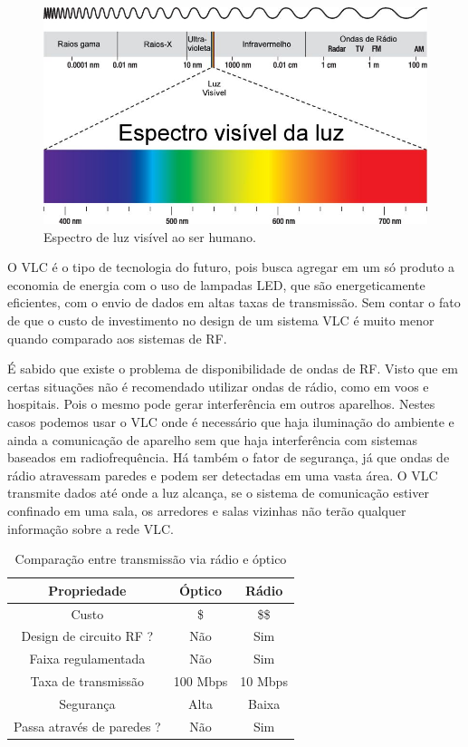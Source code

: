 \begin{figure}
	\centering
		\includegraphics[width = 12cm]{figuras/espectro-visivel-da-luz}
	\caption{Espectro de luz visível ao ser humano.}
	\label{Fig: espectro-visivel-da-luz}
\end{figure}


O VLC é o tipo de tecnologia do futuro, pois busca agregar em um só produto a economia de energia com o uso de lampadas LED, que são energeticamente eficientes, com o envio de dados em altas taxas de transmissão. Sem contar o fato de que o custo de investimento no design de um sistema VLC é muito menor quando comparado aos sistemas de RF.

É sabido que existe o problema de disponibilidade de ondas de RF. Visto que em certas situações não é recomendado utilizar ondas de rádio, como em voos e hospitais. Pois o mesmo pode gerar interferência em outros aparelhos. Nestes casos podemos usar o VLC onde é necessário que haja iluminação do ambiente e ainda a comunicação de aparelho sem que haja interferência com sistemas baseados em radiofrequência. Há também o fator de segurança, já que ondas de rádio atravessam paredes e podem ser detectadas em uma vasta área. O VLC transmite dados até onde a luz alcança, se o sistema de comunicação estiver confinado em uma sala, os arredores e salas vizinhas não terão qualquer informação sobre a rede VLC.

\begin{table}[h]
	\centering
	\begin{tabular}{ccc}
		\toprule
		\textbf{Propriedade} & \textbf{Óptico} &
		\textbf{Rádio}\\
		\midrule
		Custo & \$ & \$\$\\
		Design de circuito RF ? & Não & Sim\\
		Faixa regulamentada & Não & Sim\\
		Taxa de transmissão & 100 Mbps & 10 Mbps\\
		Segurança & Alta & Baixa\\
		Passa através de paredes ? & Não & Sim\\
		\bottomrule
	\end{tabular}
	
	\caption{Comparação entre transmissão via rádio e óptico \cite{Hranilovic}}
	\label{Tab: Rádio vs VLC}
\end{table}

